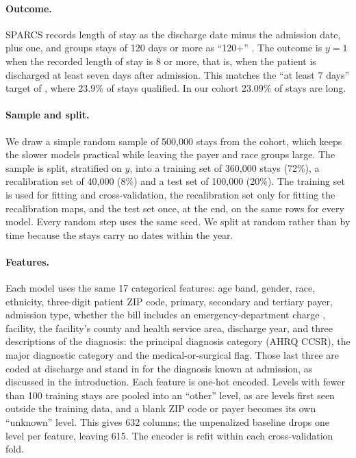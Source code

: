\documentclass{article}
\begin{document}
\paragraph{Outcome.}
SPARCS records length of stay as the discharge date minus the admission date,
plus one, and groups stays of 120 days or more as ``120+''
\citep{sparcs}. The outcome is $y = 1$ when the recorded length
of stay is 8 or more, that is, when the patient is discharged at least seven
days after admission. This matches the ``at least 7 days'' target of
\citet{rajkomar2018}, where 23.9\% of stays qualified. In our cohort 23.09\%
of stays are long.

\paragraph{Sample and split.}
We draw a simple random sample of 500{,}000 stays from the cohort, which keeps
the slower models practical while leaving the payer and race groups large.
The sample is split, stratified on $y$, into a training set of 360{,}000 stays
(72\%), a recalibration set of 40{,}000 (8\%) and a test set of 100{,}000
(20\%). The training set is used for fitting and cross-validation, the
recalibration set only for fitting the recalibration maps, and the test set
once, at the end, on the same rows for every model. Every random step uses the
same seed. We split at random rather than by time because the stays carry no
dates within the year.

\paragraph{Features.}
Each model uses the same 17 categorical features: age band, gender, race,
ethnicity, three-digit patient ZIP code, primary, secondary and tertiary
payer, admission type, whether the bill includes an emergency-department
charge \citep{sparcs}, facility, the facility's county and
health service area, discharge year, and three descriptions of the diagnosis:
the principal diagnosis category (AHRQ CCSR), the major diagnostic category
and the medical-or-surgical flag. Those last three are coded at discharge and
stand in for the diagnosis known at admission, as discussed in the
introduction. Each feature is one-hot encoded. Levels with fewer than 100
training stays are pooled into an ``other'' level, as are levels first seen
outside the training data, and a blank ZIP code or payer becomes its own
``unknown'' level. This gives 632 columns; the unpenalized baseline drops one
level per feature, leaving 615. The encoder is refit within each
cross-validation fold.
\end{document}
